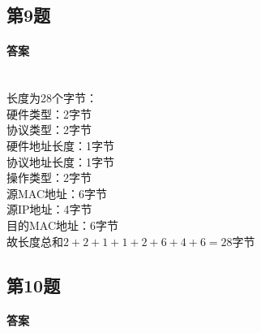 \documentclass[UTF8]{article}
\begin{document}
\subsection{第9题}
\paragraph{答案}
~\\
长度为28个字节：  \\
硬件类型：2字节 \\
协议类型：2字节 \\
硬件地址长度：1字节 \\
协议地址长度：1字节 \\
操作类型：2字节 \\
源MAC地址：6字节 \\
源IP地址：4字节 \\
目的MAC地址：6字节 \\
故长度总和$ 2+2+1+1+2+6+4+6=28 $字节
\subsection{第10题}
\paragraph{答案}
\end{document}
